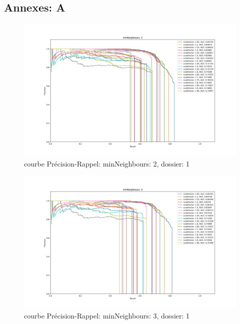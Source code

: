 \documentclass[a4paper,11pt]{article}
\begin{document}
    \subsection{Annexes: A}
    \label{annexes_a}

	\begin{figure}[H]
	    \begin{center}
		\includegraphics[scale = 0.4]{images/courbes/folder_01_minN_2.png}
		\caption{courbe Précision-Rappel: minNeighbours: 2, dossier: 1}
		\label{fig:minN_2}
	    \end{center}
	\end{figure}

	\begin{figure}[H]
	    \begin{center}
		\includegraphics[scale = 0.4]{images/courbes/folder_01_minN_3.png}
		\caption{courbe Précision-Rappel: minNeighbours: 3, dossier: 1}
		\label{fig:minN_2}
	    \end{center}
	\end{figure}
\end{document}
